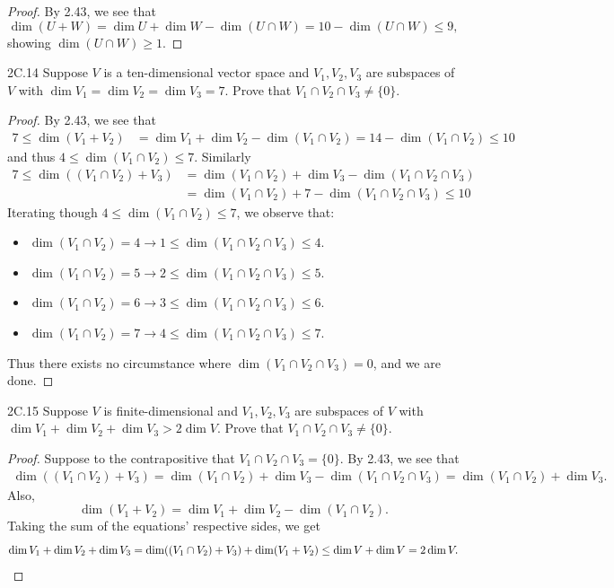 \documentclass{exam}
\begin{document}
\begin{proof}
    By 2.43, we see that \[
        \dim(U + W)  = \dim U +\dim W - \dim(U \cap W) = 10 - \dim(U\cap W)\le 9,
    \]
    showing $\dim(U \cap W) \ge 1$.
\end{proof}

\begin{problem}{2C.14}
    Suppose $V$ is a ten-dimensional vector space and $V_1, V_2, V_3$ are subspaces of $V$ with $\dim V_1 = \dim V_2 = \dim V_3 = 7$. Prove that $V_1 \cap V_2 \cap V_3 \neq\{0\}$.
\end{problem}

\begin{proof}
    By 2.43, we see that
    \begin{align*}
        7\le\dim(V_1 + V_2) &= \dim V_1 + \dim V_2 - \dim(V_1 \cap V_2) = 14 - \dim(V_1\cap V_2)\le10
    \end{align*}
    and thus $4\le\dim(V_1 \cap V_2)\le7$. Similarly
    \begin{align*}
        7\le\dim((V_1 \cap V_2) + V_3) &= \dim(V_1 \cap V_2) + \dim V_3 - \dim(V_1 \cap V_2 \cap V_3)\\
        &= \dim(V_1 \cap V_2) + 7 - \dim(V_1 \cap V_2 \cap V_3) \le 10
    \end{align*}
    Iterating though $4\le\dim(V_1\cap V_2)\le7$, we observe that:
    \begin{itemize}
        \item $\dim(V_1\cap V_2) = 4\to1\le\dim(V_1\cap V_2\cap V_3)\le4$.
        \item $\dim(V_1\cap V_2) = 5\to2\le\dim(V_1\cap V_2\cap V_3)\le5$.
        \item $\dim(V_1\cap V_2) = 6\to3\le\dim(V_1\cap V_2\cap V_3)\le6$.
        \item $\dim(V_1\cap V_2) = 7\to4\le\dim(V_1\cap V_2\cap V_3)\le7$.
    \end{itemize}
    Thus there exists no circumstance where $\dim(V_1\cap V_2\cap V_3) = 0$, and we are done.
\end{proof}

\begin{problem}{2C.15}
    Suppose $V$ is finite-dimensional and $V_1, V_2, V_3$ are subspaces of $V$ with $\dim V_1 + \dim V_2 + \dim V_3 > 2\dim V$. Prove that $V_1 \cap V_2 \cap V_3 \neq\{0\}$.
\end{problem}

\begin{proof}
    Suppose to the contrapositive that $V_1\cap V_2\cap V_3 = \{0\}$. By 2.43, we see that
    \begin{align*}
        \dim((V_1 \cap V_2) + V_3) = \dim(V_1 \cap V_2) + \dim V_3 - \dim(V_1 \cap V_2 \cap V_3) = \dim(V_1 \cap V_2) + \dim V_3.
    \end{align*}
    Also, \[
        \dim(V_1 + V_2) = \dim V_1 + \dim V_2 - \dim(V_1 \cap V_2).
    \]
    Taking the sum of the equations' respective sides, we get \[
        \dim V_1 + \dim V_2 + \dim V_3 = \dim((V_1 \cap V_2) + V_3) + \dim(V_1 + V_2)\le\dim V + \dim V = 2\dim V.\qedhere
    \]
\end{proof}
\end{document}
